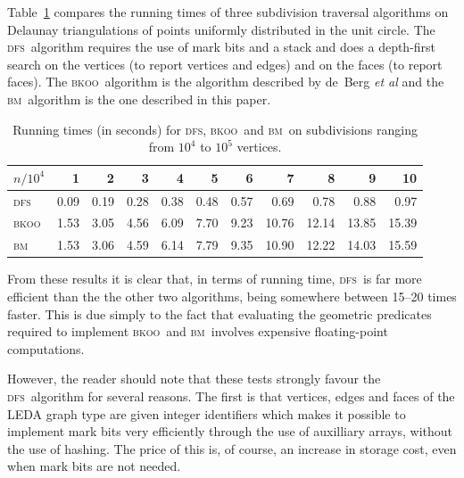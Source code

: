 \documentclass{article}
\newcommand{\tablabel}[1]{\label{tab:#1}}
\newcommand{\tabref}[1]{Table~\ref{tab:#1}}
\newcommand{\bkoo}{\textsc{bkoo}}
\newcommand{\bosemorin}{\textsc{bm}}
\newcommand{\dfs}{\textsc{dfs}}
\newcommand{\etal}{\emph{et al}}
\begin{document}
\tabref{bkoo-bm-dfs} compares the running times of three subdivision
traversal algorithms on Delaunay triangulations of points uniformly
distributed in the unit circle.  The \dfs\ algorithm requires the use
of mark bits and a stack and does a depth-first search on the vertices
(to report vertices and edges) and on the faces (to report faces).
The \bkoo\ algorithm is the algorithm described by \mbox{de Berg}
\etal\cite{bkoo97} and the \bosemorin\ algorithm is the one described in
this paper.

\begin{table}
\begin{center}
{\small
\begin{tabular}{|l|r|r|r|r|r|r|r|r|r|r|} \hline
$n/10^4$ & 1&2&3&4&5&6&7&8&9&10 \\ \hline\hline
\dfs &0.09&0.19&0.28&0.38&0.48&0.57&0.69&0.78&0.88&0.97\\
\bkoo&1.53&3.05&4.56&6.09&7.70&9.23&10.76&12.14&13.85&15.39\\
\bosemorin  &1.53&3.06&4.59&6.14&7.79&9.35&10.90&12.22&14.03&15.59\\
\hline
\end{tabular}
}
\end{center}
\caption{Running times (in seconds) for \dfs, \bkoo\ and \bosemorin\ on 
	subdivisions ranging from $10^4$ to $10^5$ vertices.}
\tablabel{bkoo-bm-dfs}
\end{table}

From these results it is clear that, in terms of running time, \dfs\
is far more efficient than the the other two algorithms, being
somewhere between 15--20 times faster.  This is due simply to the fact
that evaluating the geometric predicates required to implement \bkoo\
and \bosemorin\ involves expensive floating-point computations.

However, the reader should note that these tests strongly favour the
\dfs\ algorithm for several reasons.  The first is that vertices,
edges and faces of the LEDA graph type are given integer identifiers
which makes it possible to implement mark bits very efficiently
through the use of auxilliary arrays, without the use of hashing.  The
price of this is, of course, an increase in storage cost, even when
mark bits are not needed.
\end{document}
